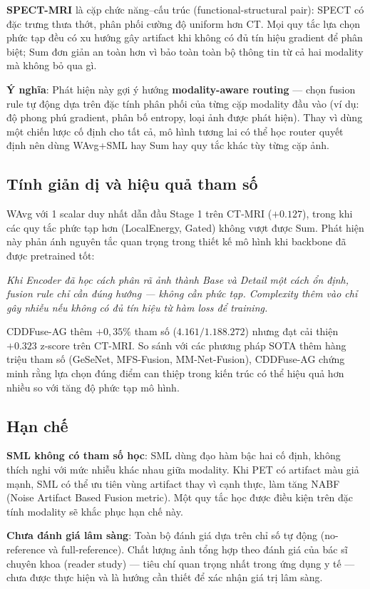 \documentclass[12pt,a4paper]{article}
\begin{document}
\textbf{SPECT-MRI} là cặp chức năng--cấu trúc (functional-structural pair):
SPECT có đặc trưng thưa thớt, phân phối cường độ uniform hơn CT. Mọi quy tắc
lựa chọn phức tạp đều có xu hướng gây artifact khi không có đủ tín hiệu gradient
để phân biệt; Sum đơn giản an toàn hơn vì bảo toàn toàn bộ thông tin từ cả hai
modality mà không bỏ qua gì.

\textbf{Ý nghĩa}: Phát hiện này gợi ý hướng \textbf{modality-aware routing} ---
chọn fusion rule tự động dựa trên đặc tính phân phối của từng cặp modality đầu
vào (ví dụ: độ phong phú gradient, phân bố entropy, loại ảnh được phát hiện).
Thay vì dùng một chiến lược cố định cho tất cả, mô hình tương lai có thể học
router quyết định nên dùng WAvg+SML hay Sum hay quy tắc khác tùy từng cặp ảnh.

\subsection{Tính giản dị và hiệu quả tham số}

WAvg với 1 scalar duy nhất dẫn đầu Stage 1 trên CT-MRI ($+0.127$), trong khi
các quy tắc phức tạp hơn (LocalEnergy, Gated) không vượt được Sum. Phát hiện này
phản ánh nguyên tắc quan trọng trong thiết kế mô hình khi backbone đã được
pretrained tốt:

\emph{Khi Encoder đã học cách phân rã ảnh thành Base và Detail một cách ổn định,
fusion rule chỉ cần đúng hướng --- không cần phức tạp. Complexity thêm vào chỉ
gây nhiễu nếu không có đủ tín hiệu từ hàm loss để training.}

CDDFuse-AG thêm $+0{,}35\%$ tham số ($4.161/1.188.272$) nhưng đạt cải thiện
$+0.323$ z-score trên CT-MRI. So sánh với các phương pháp SOTA thêm hàng triệu
tham số (GeSeNet, MFS-Fusion, MM-Net-Fusion), CDDFuse-AG chứng minh rằng lựa
chọn đúng điểm can thiệp trong kiến trúc có thể hiệu quả hơn nhiều so với tăng
độ phức tạp mô hình.

\subsection{Hạn chế}

\textbf{SML không có tham số học}: SML dùng đạo hàm bậc hai cố định, không thích
nghi với mức nhiễu khác nhau giữa modality. Khi PET có artifact màu giả mạnh, SML
có thể ưu tiên vùng artifact thay vì cạnh thực, làm tăng NABF (Noise Artifact
Based Fusion metric). Một quy tắc học được điều kiện trên đặc tính modality sẽ
khắc phục hạn chế này.

\textbf{Chưa đánh giá lâm sàng}: Toàn bộ đánh giá dựa trên chỉ số tự động (no-reference
và full-reference). Chất lượng ảnh tổng hợp theo đánh giá của bác sĩ chuyên khoa
(reader study) --- tiêu chí quan trọng nhất trong ứng dụng y tế --- chưa được thực
hiện và là hướng cần thiết để xác nhận giá trị lâm sàng.
\end{document}
